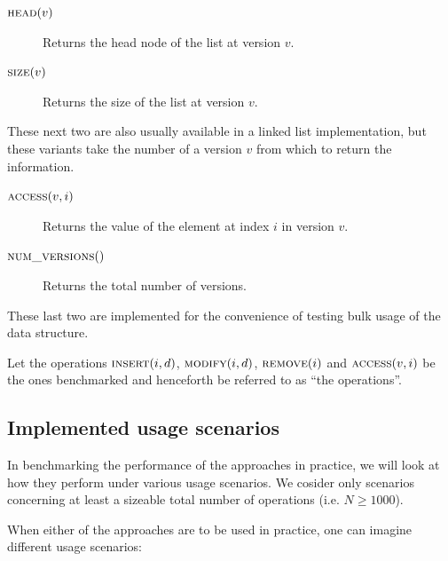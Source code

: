 \begin{description}

  \item[$\textsc{head}(v)$] Returns the head node of the list at version
  $v$.

  \item[$\textsc{size}(v)$] Returns the size of the list at version $v$.

\end{description}

These next two are also usually available in a linked list implementation, but
these variants take the number of a version $v$ from which to return the
information.

\begin{description}

  \item[$\textsc{access}(v,i)$] Returns the value of the element at index $i$ in
  version $v$.

  \item[$\textsc{num\_versions}()$] Returns the total number of versions.

\end{description}

These last two are implemented for the convenience of testing bulk usage of the
data structure.

Let the operations $\textsc{insert}(i,d)$, $\textsc{modify}(i,d)$,
$\textsc{remove}(i)$ and $\textsc{access}(v,i)$ be the ones benchmarked and
henceforth be referred to as ``the operations''.

\subsection{Implemented usage scenarios}

In benchmarking the performance of the approaches in practice, we will look at
how they perform under various usage scenarios. We cosider only scenarios
concerning at least a sizeable total number of operations (i.e. $N \ge 1000$).

When either of the approaches are to be used in practice, one can imagine
different usage scenarios:

